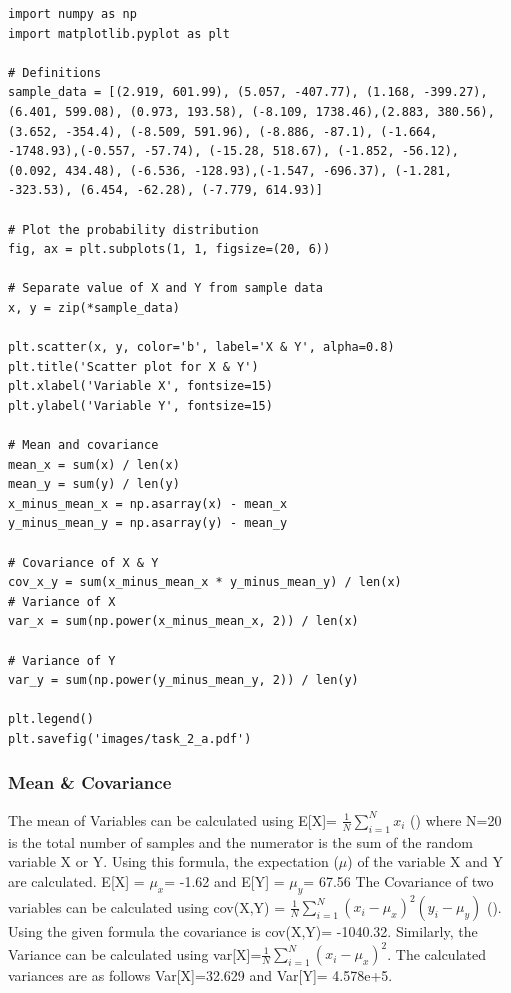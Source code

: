 \begin{lstlisting}[caption={Plotting the Scatter Plot with Variance Calculations)},label={lst:code_task_2_a}]
import numpy as np
import matplotlib.pyplot as plt

# Definitions
sample_data = [(2.919, 601.99), (5.057, -407.77), (1.168, -399.27), (6.401, 599.08), (0.973, 193.58), (-8.109, 1738.46),(2.883, 380.56), (3.652, -354.4), (-8.509, 591.96), (-8.886, -87.1), (-1.664, -1748.93),(-0.557, -57.74), (-15.28, 518.67), (-1.852, -56.12), (0.092, 434.48), (-6.536, -128.93),(-1.547, -696.37), (-1.281, -323.53), (6.454, -62.28), (-7.779, 614.93)]

# Plot the probability distribution
fig, ax = plt.subplots(1, 1, figsize=(20, 6))

# Separate value of X and Y from sample data
x, y = zip(*sample_data)

plt.scatter(x, y, color='b', label='X & Y', alpha=0.8)
plt.title('Scatter plot for X & Y')
plt.xlabel('Variable X', fontsize=15)
plt.ylabel('Variable Y', fontsize=15)

# Mean and covariance
mean_x = sum(x) / len(x)
mean_y = sum(y) / len(y)
x_minus_mean_x = np.asarray(x) - mean_x
y_minus_mean_y = np.asarray(y) - mean_y

# Covariance of X & Y
cov_x_y = sum(x_minus_mean_x * y_minus_mean_y) / len(x)
# Variance of X
var_x = sum(np.power(x_minus_mean_x, 2)) / len(x)

# Variance of Y
var_y = sum(np.power(y_minus_mean_y, 2)) / len(y)

plt.legend()
plt.savefig('images/task_2_a.pdf')
\end{lstlisting}

\subsubsection{Mean \& Covariance}   

The mean of Variables can be calculated using E[X]=  $\frac{1}{N} \sum_{i=1}^{N}x_i$  (\cite{Iubh:2021}) where N=20 is the total number of samples and the numerator is the sum of the random variable X or Y. Using this formula, the expectation ($\mu$) of the variable X and Y are calculated. E[X] = $\mu_x$= -1.62 and E[Y] = $\mu_y$= 67.56 \newline 
The Covariance of two variables can be calculated using cov(X,Y) =  $\frac{1}{N} \sum_{i=1}^{N}(x_i - \mu_x)^2 (y_i - \mu_y)$ (\cite{Iubh:2021}). Using the given formula the covariance is cov(X,Y)= -1040.32.\newline
Similarly, the Variance can be calculated using var[X]=$\frac{1}{N} \sum_{i=1}^{N}(x_i - \mu_x)^2$. The calculated variances are as follows Var[X]=32.629 and Var[Y]= 4.578e+5.

